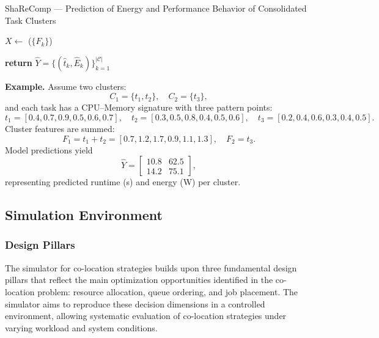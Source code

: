 \begin{algorithm}[H]
    \caption{ShaReComp — Prediction of Energy and Performance Behavior of Consolidated Task Clusters}
    \label{alg:sharecomp_prediction}


    \BlankLine
    $X \gets$ \Build($\{F_k\}$) 

    \BlankLine
    \BlankLine
    \textbf{return } $\hat{Y} = \{ (\hat{t}_k, \hat{E}_k) \}_{k=1}^{|\mathcal{C}|}$
\end{algorithm}

\textbf{Example.}
Assume two clusters:
\[
    C_1 = \{t_1, t_2\}, \quad C_2 = \{t_3\},
\]
and each task has a CPU–Memory signature with three pattern points:
\[
    t_1 = [0.4, 0.7, 0.9, 0.5, 0.6, 0.7], \quad
    t_2 = [0.3, 0.5, 0.8, 0.4, 0.5, 0.6], \quad
    t_3 = [0.2, 0.4, 0.6, 0.3, 0.4, 0.5].
\]
Cluster features are summed:
\[
    F_1 = t_1 + t_2 = [0.7, 1.2, 1.7, 0.9, 1.1, 1.3], \quad
    F_2 = t_3.
\]
Model predictions yield
\[
    \hat{Y} =
    \begin{bmatrix}
        10.8 & 62.5 \\
        14.2 & 75.1
    \end{bmatrix},
\]
representing predicted runtime (s) and energy (W) per cluster.

\subsection{Simulation Environment}
\label{sec:simulation_environment}

\subsubsection{Design Pillars}
\label{sec:design_pillars}
The simulator for co-location strategies builds upon three fundamental design pillars that reflect the main optimization opportunities identified in the co-location problem: resource allocation, queue ordering, and job placement. The simulator aims to reproduce these decision dimensions in a controlled environment, allowing systematic evaluation of co-location strategies under varying workload and system conditions.


